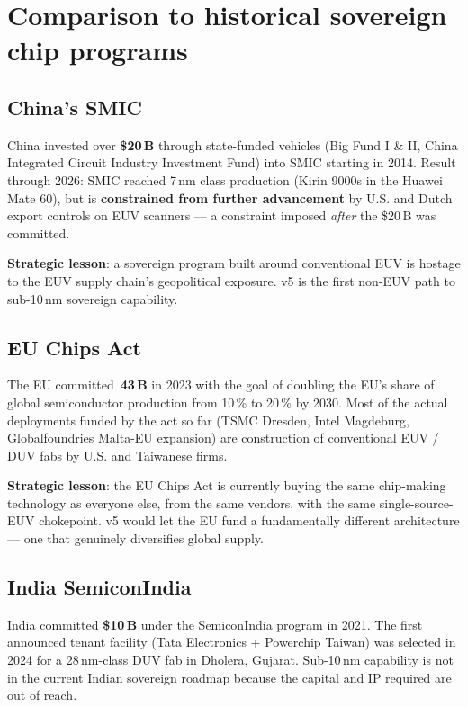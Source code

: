 \documentclass[11pt,letterpaper]{article}
\begin{document}
\section{Comparison to historical sovereign chip programs}

\subsection{China's SMIC}

China invested over \textbf{\$20\,B} through state-funded vehicles (Big Fund I \& II, China Integrated Circuit Industry Investment Fund) into SMIC starting in 2014. Result through 2026: SMIC reached 7\,nm class production (Kirin 9000s in the Huawei Mate 60), but is \textbf{constrained from further advancement} by U.S. and Dutch export controls on EUV scanners --- a constraint imposed \textit{after} the \$20\,B was committed.

\textbf{Strategic lesson}: a sovereign program built around conventional EUV is hostage to the EUV supply chain's geopolitical exposure. v5 is the first non-EUV path to sub-10\,nm sovereign capability.

\subsection{EU Chips Act}

The EU committed \textbf{\texteuro\,43\,B} in 2023 with the goal of doubling the EU's share of global semiconductor production from 10\,\% to 20\,\% by 2030. Most of the actual deployments funded by the act so far (TSMC Dresden, Intel Magdeburg, Globalfoundries Malta-EU expansion) are construction of conventional EUV / DUV fabs by U.S. and Taiwanese firms.

\textbf{Strategic lesson}: the EU Chips Act is currently buying the same chip-making technology as everyone else, from the same vendors, with the same single-source-EUV chokepoint. v5 would let the EU fund a fundamentally different architecture --- one that genuinely diversifies global supply.

\subsection{India SemiconIndia}

India committed \textbf{\$10\,B} under the SemiconIndia program in 2021. The first announced tenant facility (Tata Electronics + Powerchip Taiwan) was selected in 2024 for a 28\,nm-class DUV fab in Dholera, Gujarat. Sub-10\,nm capability is not in the current Indian sovereign roadmap because the capital and IP required are out of reach.
\end{document}
